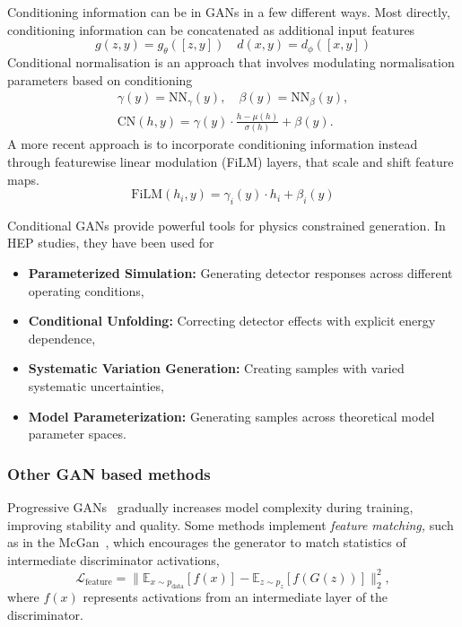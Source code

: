         Conditioning information can be in GANs in a few different ways.
        Most directly, conditioning information can be concatenated as additional input features
        \begin{equation}
             g(z,y) = g_{\theta}([z, y])\quad d(x,y) = d_{\phi}([x,y])
        \end{equation}
        Conditional normalisation is an approach that involves modulating normalisation parameters based on conditioning
        \begin{gather}
            \gamma(y) = \text{NN}_{\gamma}(y),\quad\beta(y) = \text{NN}_{\beta}(y),\\
            \text{CN}(h,y) = \gamma(y) \cdot \frac{h - \mu(h)}{\sigma(h)} + \beta(y).
        \end{gather}
        A more recent approach is to incorporate conditioning information instead through featurewise linear modulation (FiLM) layers, that scale and shift feature maps.
        \begin{equation}
            \text{FiLM}(h_i,y) = \gamma_i(y) \cdot h_i + \beta_i(y)
        \end{equation}

        Conditional GANs provide powerful tools for physics constrained generation.
        In HEP studies, they have been used for
        \begin{itemize}
            \item \textbf{Parameterized Simulation:} Generating detector responses across different operating conditions,
            \item \textbf{Conditional Unfolding:} Correcting detector effects with explicit energy dependence,
            \item \textbf{Systematic Variation Generation:} Creating samples with varied systematic uncertainties,
            \item \textbf{Model Parameterization:} Generating samples across theoretical model parameter spaces.
        \end{itemize}

        \subsubsection{Other GAN based methods}
            Progressive GANs~\cite{karras_progressive_2018} gradually increases model complexity during training, improving stability and quality.
            Some methods implement \emph{feature matching,} such as in the McGan~\cite{mroueh_mcgan_2017}, which encourages the generator to match statistics of intermediate discriminator activations,
            \begin{equation}
                \mathcal{L}_{\text{feature}} = \|\mathbb{E}_{x \sim p_{\text{data}}}[f(x)] - \mathbb{E}_{z \sim p_z}[f(G(z))]\|_2^2,
            \end{equation}
            where \(f(x)\) represents activations from an intermediate layer of the discriminator.
